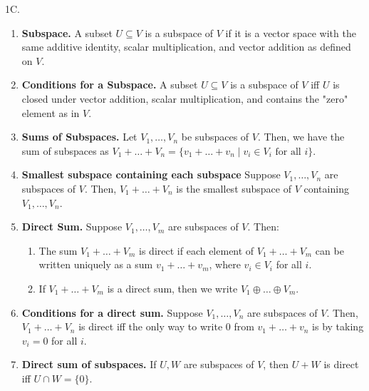 \documentclass[12pt]{article}
\theoremstyle{definition}
\theoremstyle{named}
\begin{document}
1C. 
\begin{enumerate}
	\item \textbf{Subspace. } A subset $U \subseteq V$ is a subspace of $V$ if it is a vector space with the same additive identity, scalar multiplication, and vector addition as defined on $V$. 
	\item \textbf{Conditions for a Subspace. } A subset $U \subseteq V$ is a subspace of $V$ iff $U$ is closed under vector addition, scalar multiplication, and contains the "zero" element as in $V$. 
	\item \textbf{Sums of Subspaces. } Let $V_1,\dots,V_n$ be subspaces of $V$. Then, we have the sum of subspaces as $V_1 + \dots + V_n = \{v_1 + \dots + v_n \mid v_i \in V_i \textrm{ for all } i\}$. 
	\item \textbf{Smallest subspace containing each subspace} Suppose $V_1,\dots,V_n$ are subspaces of $V$. Then, $V_1 + \dots + V_n$ is the smallest subspace of $V$ containing $V_1,\dots,V_n$. 
	\item \textbf{Direct Sum. } Suppose $V_1,\dots,V_m$ are subspaces of $V$. Then: 
	\begin{enumerate}
		\item The sum $V_1 + \dots + V_m$ is direct if each element of $V_1 + \dots + V_m$ can be written uniquely as a sum $v_1 + \dots + v_m$, where $v_i \in V_i$ for all $i$. 
		\item If $V_1 + \dots + V_m$ is a direct sum, then we write $V_1 \oplus \dots \oplus V_m$. 
	\end{enumerate}
	\item \textbf{Conditions for a direct sum. } Suppose $V_1,\dots,V_n$ are subspaces of $V$. Then, $V_1 + \dots + V_n$ is direct iff the only way to write 0 from $v_1 + \dots + v_n$ is by taking $v_i=0$ for all $i$. 
	\item \textbf{Direct sum of subspaces. } If $U,W$ are subspaces of $V$, then $U + W$ is direct iff $U \cap W = \{0\}$. 
	
\end{enumerate}
\end{document}
